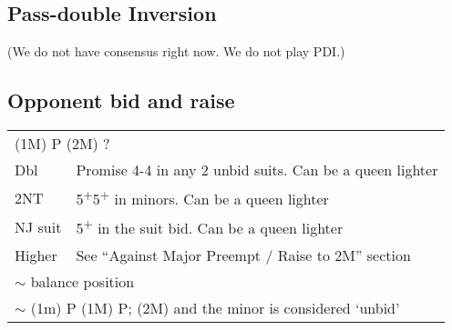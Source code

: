 \documentclass{article}
\newcommand{\nt}{\relsize{-1}NT\relsize{1}}
\newcommand{\up}{\textsuperscript{+}}
\begin{document}
\subsection{Pass-double Inversion}
(We do not have consensus right now. We do not play PDI.)

\subsection{Opponent bid and raise}

\medskip

\begin{tabular}{|l|p{6.5cm}}
	\multicolumn{2}{l}{(1M) P (2M) ?} \\
    Dbl & Promise 4-4 in any 2 unbid suits. Can be a queen lighter \\
    2\nt & 5\up{}5\up{} in minors. Can be a queen lighter \\
    NJ suit & 5\up{} in the suit bid. Can be a queen lighter \\
	Higher & See ``Against Major Preempt / Raise to 2M'' section \\
	\multicolumn{2}{l}{$\sim$ balance position} \\
	\multicolumn{2}{l}{$\sim$ (1m) P (1M) P; (2M) and the minor is considered `unbid'}
\end{tabular}
\end{document}
